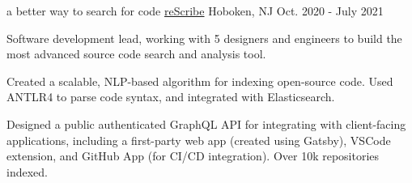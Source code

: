 \begin{cventries}
  \cventry
  {a better way to search for code} %
  {\href{https://rescribe.dev}{reScribe}} %
  {Hoboken, NJ} %
  {Oct. 2020 - July 2021} %
  {
    \begin{cvitems} %
      \item {Software development lead, working with 5 designers and engineers to build the most advanced source code search and analysis tool.}
      \item {Created a scalable, NLP-based algorithm for indexing open-source code. Used ANTLR4 to parse code syntax, and integrated with Elasticsearch.}
      \item {Designed a public authenticated GraphQL API for integrating with client-facing applications, including a first-party web app (created using Gatsby), VSCode extension, and GitHub App (for CI/CD integration). Over 10k repositories indexed.}
    \end{cvitems}
  }


\end{cventries}
